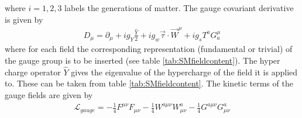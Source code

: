 where $i=1,2,3$ labels the generations of matter. The gauge covariant derivative is given by
\begin{align}
D_\mu = \partial_\mu + i g_Y\frac{\hat{Y}}{2} +ig_w \vec{\tau}\cdot \vec{W}^\mu + i g_s T^a G_a^\mu
\end{align}
where for each field the corresponding representation (fundamental or trivial) of the gauge group is to be inserted (see table \ref{tab:SMfieldcontent}). The hyper charge operator $\hat{Y}$ gives the eigenvalue of the hypercharge of the field it is applied to. These can be taken from table \ref{tab:SMfieldcontent}.
The kinetic terms of the gauge fields are given by
\begin{align}
\mathcal{L}_{gauge} = -\frac{1}{4}F^{\mu\nu}F_{\mu\nu} - \frac{1}{4}W^{a\mu\nu}W^a_{\mu\nu} - \frac{1}{4}G^{a\mu\nu}G^a_{\mu\nu}
\end{align}



